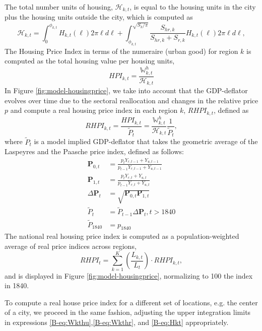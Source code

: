 \documentclass[11pt]{report}
\begin{document}
The total number units of housing, $\mathcal{H}_{k,t}$, is equal to the housing units in the city plus the housing units outside the city, which is computed as 
\begin{equation}
\mathcal{H}_{k,t}=\int_0^{\phi_{k,t}}H_{k,t}(\ell) 2 \pi \ell d\ell + \int_{\phi_{k,t}}^{\sqrt{S_{k}/\pi}}\frac{S_{hr,k}}{S_{hr,k}+S_{r,k}}H_{k,t}(\ell) 2 \pi \ell  d\ell,\label{B-eq:Hkt}
\end{equation}
The Housing Price Index in terms of the numeraire (urban good) for region $k$ is computed as the total housing value per housing units,
\begin{equation*}
HPI_{k,t}=\frac{\mathbb{W}_{k,t}^h}{\mathcal{H}_{k,t}}
\end{equation*}
In Figure \ref{fig:model-housingprice}, we take into account that the GDP-deflator evolves over time due to the sectoral reallocation and changes in the relative price $p$ and compute a real housing price index in each region $k$, $RHPI_{k,t}$, defined as
\begin{equation}
RHPI_{k,t}=\frac{HPI_{k,t}}{\tilde{P}_t}=\frac{\mathbb{W}_{k,t}^h}{\mathcal{H}_{k,t}} \frac{1}{\tilde{P}_t}, \label{B-eq:HPI}
\end{equation}
where  $\tilde{P}_t$ is a model implied GDP-deflator that takes the geometric average of the Laspeyres and the Paasche price index, defined as follows:
\begin{align}
\mathbf{P}_{0,t} &= \frac{p_t Y_{r,t-1} + Y_{u,t-1}}{p_{t-1} Y_{r,t-1} + Y_{u,t-1}} \nonumber\\
\mathbf{P}_{1,t} &= \frac{p_t Y_{r,t} + Y_{u,t}}{p_{t-1} Y_{r,t} + Y_{u,t}}\nonumber\\
\Delta \mathbf{P}_{t} &= \sqrt{\mathbf{P}_{0,t} \mathbf{P}_{1,t}}\nonumber\\
\tilde{P}_t &= \tilde{P}_{t-1}  \Delta \mathbf{P}_{t}, t> 1840 \nonumber \\
\tilde{P}_{1840} &= p_{1840}
\end{align}
The national real housing price index is computed as a population-weighted average of real price indices across regions,
\begin{equation*}
RHPI_{t}=\sum_{k=1}^{K}\left( \frac{L_{k,t}}{L_t}\right) \cdot RHPI_{k,t},
\end{equation*}
and is displayed in Figure \ref{fig:model-housingprice}, normalizing to 100 the index in 1840.

To compute a real house price index for a different set of locations, e.g. the center of a city, we proceed in the same fashion, adjusting the upper integration limits in expressions \eqref{B-eq:Wkthu},\eqref{B-eq:Wkthr}, and \eqref{B-eq:Hkt} appropriately.
\end{document}
